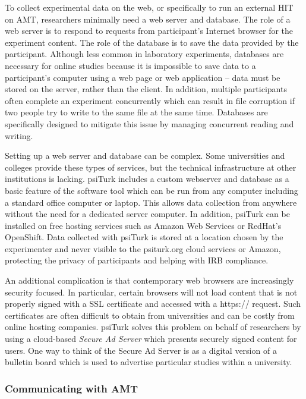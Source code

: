 \documentclass[twocolumn]{svjour3}          %
\newcommand{\psiturk}[0]{\textsf{psiTurk}}
\begin{document}
To collect experimental data on the web, or specifically to run an external HIT on AMT, 
researchers minimally need a web server and database.  
The role of a web server is to respond to requests from participant's Internet browser 
for the experiment content.  The role of the database is to save the data provided by 
the participant.  Although less common in laboratory experiments, databases are 
necessary for online studies because it is impossible to save data to a participant's 
computer using a web page or web application -- data must be stored on the server,
rather than the client.  In addition, multiple participants often complete an 
experiment concurrently which can result in file corruption if two people try to
write to the same file at the same time. Databases are specifically designed to 
mitigate this issue by managing concurrent reading and writing.
 
Setting up a web server and database can be complex.  Some universities and colleges
provide these types of services, but the technical infrastructure at other 
institutions is lacking.  \psiturk{} includes a custom webserver and database
as a basic feature of the software tool which can be run from any computer
including a standard office computer or laptop.  This allows data collection from
anywhere without the need for a dedicated server computer.  In addition, \psiturk{}
can be installed on free hosting services such as Amazon Web Services
or RedHat's OpenShift.  Data collected with \psiturk{} is stored at a location
chosen by the experimenter and never visible to the \textsf{psiturk.org} cloud
services or Amazon, protecting the privacy of participants and helping with IRB compliance.

An additional complication is that contemporary web browsers are increasingly security
focused.  In particular, certain browsers will not load content that is not properly 
signed with a SSL certificate and accessed with a \textsf{https://} request.  Such certificates
are often difficult to obtain from universities and can be costly from online
hosting companies.  \psiturk{} solves this problem on behalf of researchers by
using a cloud-based \emph{Secure Ad Server} which presents securely signed
content for users.  One way to think of the Secure Ad Server is as a digital
version of a bulletin board which is used to advertise particular
studies within a university.


\subsubsection{Communicating with AMT}
\end{document}
